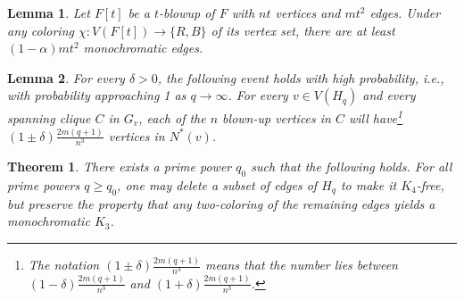 \documentclass[10pt,a4paper]{amsart}
\newtheorem{theorem}{Theorem}
\newtheorem{lemma}{Lemma}
\def\a{\alpha}
\def\d{\delta}
\begin{document}
\begin{lemma}
\label{lem: blowup-coloring}
    Let $F[t]$ be a $t$-blowup of $F$ with $nt$ vertices and $mt^2$ edges.
    Under any coloring $\chi: V(F[t]) \to \{R,B\}$ of its vertex set, there are at least $(1 - \a)mt^2$ monochromatic edges.
\end{lemma}

\begin{lemma}
\label{lem: blowup}
    For every $\d > 0$, the following event holds with high probability, i.e., with probability approaching 1 as $q \to \infty$.
    For every $v \in V(H_q)$ and every spanning clique $C$ in $G_v$,
    each of the $n$ blown-up vertices in $C$ will have\footnote{The notation $(1 \pm \d) \frac{2m(q+1)}{n^3}$ means that the number lies between $(1 - \d) \frac{2m(q+1)}{n^3}$ and $(1 + \d) \frac{2m(q+1)}{n^3}$.} $(1 \pm \d) \frac{2m(q+1)}{n^3}$ vertices in $N^*(v)$.
\end{lemma}

\begin{theorem}
\label{thm: main-2}
    There exists a prime power $q_0$ such that the following holds.
    For all prime powers $q \geq q_0$, one may delete a subset of edges of $H_q$ to make it $K_4$-free, but preserve the property that any two-coloring of the remaining edges yields a monochromatic $K_3$. 
\end{theorem}
\end{document}
